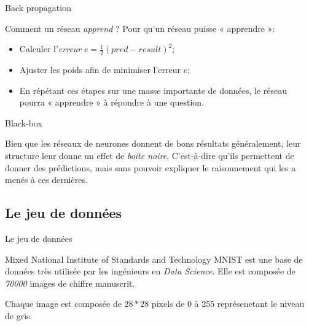 \documentclass[10pt,handout]{beamer}
\newif\ifplacelogo %
\begin{document}
\begin{frame}{Back propagation}
    \begin{block}{Comment un réseau \textit{apprend} ?}
        Pour qu'un réseau puisse « apprendre »:
        \begin{itemize}
            \item Calculer l'\textit{erreur} $ e = \frac{1}{2}(pred - result)^{2}$;
            \item Ajuster les poids afin de minimiser l'erreur $ e $;
            \item En répétant ces étapes sur une masse importante de données, le réseau pourra « apprendre » à répondre à une question.
        \end{itemize}
    \end{block}
\end{frame}

\begin{frame}{Black-box}
    \begin{block}{}
        Bien que les réseaux de neurones donnent de bons résultats généralement, leur structure leur donne un effet de \textit{boite noire}. C'est-à-dire qu'ils permettent de donner des prédictions, mais sans pouvoir expliquer le raisonnement qui les a menés à ces dernières.
    \end{block}
\end{frame}

\placelogofalse
\subsection{Le jeu de données}

\begin{frame}{Le jeu de données}
    \begin{block}{Mixed National Institute of Standards and Technology}
        MNIST est une base de données très utilisée par les ingénieurs en \textit{Data Science}. Elle est composée de \textit{70000} images de chiffre manuscrit.

        Chaque image est composée de $28 * 28$ pixels de 0 à 255 représenetant le niveau de gris. 
    \end{block}
\end{frame}
\end{document}
